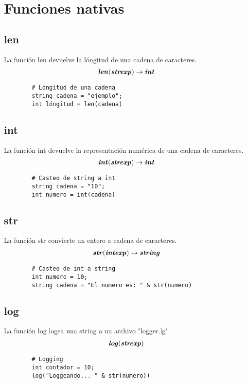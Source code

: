 \documentclass{article}
\begin{document}
    \newpage
    \section{Funciones nativas}
    \subsection{len}
    La función len devuelve la lóngitud de una cadena de caracteres.
    \begin{align} 
        \textbf{\textit{len}}( \textbf{\textit{strexp}} ) \rightarrow \textbf{\textit{int}}
    \end{align}
    \begin{lstlisting}
        # Lóngitud de una cadena
        string cadena = "ejemplo";
        int lóngitud = len(cadena)
    \end{lstlisting}
    \subsection{int}
    La función int devuelve la representación numérica de una cadena de caracteres.
    \begin{align} 
        \textbf{\textit{int}}( \textbf{\textit{strexp}} ) \rightarrow \textbf{\textit{int}}
    \end{align}
    \begin{lstlisting}
        # Casteo de string a int
        string cadena = "10";
        int numero = int(cadena)
    \end{lstlisting}
    \subsection{str}
    La función str convierte un entero a cadena de caracteres.
    \begin{align} 
        \textbf{\textit{str}} ( \textbf{\textit{intexp}} ) \rightarrow \textbf{\textit{string}}
    \end{align}
    \begin{lstlisting}
        # Casteo de int a string
        int numero = 10;
        string cadena = "El numero es: " & str(numero) 
    \end{lstlisting}
    \subsection{log}
    La función log logea una string a un archivo "logger.lg".
    \begin{align} 
        \textbf{\textit{log}} ( \textbf{\textit{strexp}} )
    \end{align}
    \begin{lstlisting}
        # Logging
        int contador = 10;
        log("Loggeando... " & str(numero)) 
    \end{lstlisting}
\end{document}
